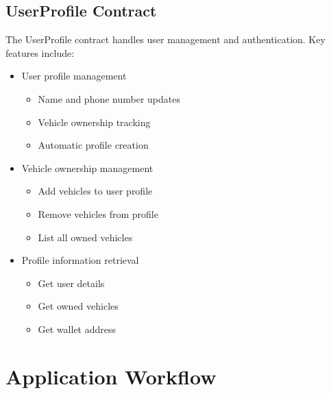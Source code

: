 \documentclass[12pt,a4paper]{article}
\begin{document}
    \subsection{UserProfile Contract}
    The UserProfile contract handles user management and authentication. Key features include:
    \begin{itemize}
        \item User profile management
        \begin{itemize}
            \item Name and phone number updates
            \item Vehicle ownership tracking
            \item Automatic profile creation
        \end{itemize}
        \item Vehicle ownership management
        \begin{itemize}
            \item Add vehicles to user profile
            \item Remove vehicles from profile
            \item List all owned vehicles
        \end{itemize}
        \item Profile information retrieval
        \begin{itemize}
            \item Get user details
            \item Get owned vehicles
            \item Get wallet address
        \end{itemize}
    \end{itemize}


    \section{Application Workflow}
\end{document}
